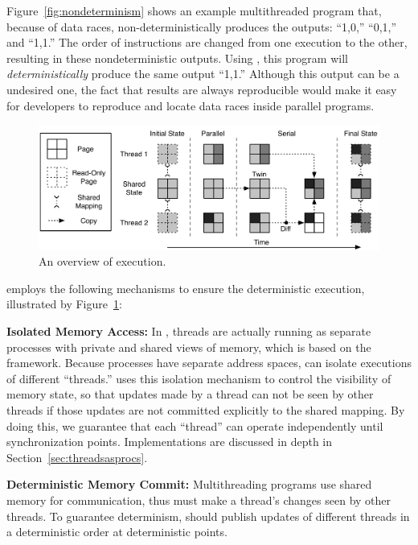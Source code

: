 Figure~\ref{fig:nondeterminism} shows an example multithreaded program that, because of data races, non-deterministically produces the outputs: ``1,0,'' ``0,1,'' and ``1,1.''  The order of instructions are changed from one execution to the other, resulting in these nondeterministic outputs. Using \dthreads{}, this program will \emph{deterministically} produce the same output ``1,1.'' Although this output can be a undesired one, the fact that results are always reproducible would make it easy for developers to reproduce and locate data races inside parallel programs.

\begin{figure}[h]
{\centering
\includegraphics[width=6in]{dthreads/figure/architecture-diagram}
\caption{An overview of \dthreads{} execution.\label{fig:architecture}}
}
\end{figure}

\dthreads{} employs the following mechanisms to ensure the deterministic execution, illustrated by Figure~\ref{fig:architecture}: 

\textbf{Isolated Memory Access:} In \dthreads{}, threads are actually running as separate processes with private and shared views of memory, which is based on the \sheriff{} framework. Because processes have separate address spaces, \dthreads{} can isolate executions of different ``threads.'' \dthreads{} uses this isolation mechanism to control the visibility of memory state, so that updates made by a thread can not be seen by other threads if those updates are not committed explicitly to the shared mapping. By doing this, we guarantee that each ``thread'' can operate independently until synchronization points. Implementations are discussed in depth in Section~\ref{sec:threadsasprocs}.

\textbf{Deterministic Memory Commit:} 
Multithreading programs use shared memory for communication, thus \dthreads{} must make a thread's changes seen by other threads. To guarantee determinism, \dthreads{} should publish updates of different threads in a deterministic order at deterministic points.

